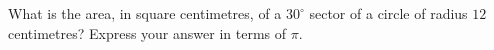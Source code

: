 What is the area, in square centimetres, of a $30^\circ$ sector of a circle of radius $12$ centimetres? Express your answer in terms of $\pi$.
